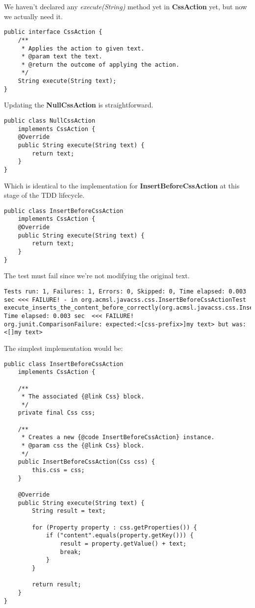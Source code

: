 \documentclass[11pt]{article}
\begin{document}
We haven't declared any \emph{execute(String)} method yet in \textbf{CssAction} yet, but now we actually need it.

\begin{verbatim}
public interface CssAction {
    /**
     * Applies the action to given text.
     * @param text the text.
     * @return the outcome of applying the action.
     */
    String execute(String text);
}
\end{verbatim}

Updating the \textbf{NullCssAction} is straightforward.

\begin{verbatim}
public class NullCssAction
    implements CssAction {
    @Override
    public String execute(String text) {
        return text;
    }
}
\end{verbatim}

Which is identical to the implementation for \textbf{InsertBeforeCssAction} at this stage of the TDD lifecycle.

\begin{verbatim}
public class InsertBeforeCssAction
    implements CssAction {
    @Override
    public String execute(String text) {
        return text;
    }
}
\end{verbatim}

The test must fail since we're not modifying the original text.

\begin{verbatim}
Tests run: 1, Failures: 1, Errors: 0, Skipped: 0, Time elapsed: 0.003 sec <<< FAILURE! - in org.acmsl.javacss.css.InsertBeforeCssActionTest
execute_inserts_the_content_before_correctly(org.acmsl.javacss.css.InsertBeforeCssActionTest)  Time elapsed: 0.003 sec  <<< FAILURE!
org.junit.ComparisonFailure: expected:<[css-prefix>]my text> but was:<[]my text>
\end{verbatim}

The simplest implementation would be:

\begin{verbatim}
public class InsertBeforeCssAction
    implements CssAction {

    /**
     * The associated {@link Css} block.
     */
    private final Css css;

    /**
     * Creates a new {@code InsertBeforeCssAction} instance.
     * @param css the {@link Css} block.
     */
    public InsertBeforeCssAction(Css css) {
        this.css = css;
    }

    @Override
    public String execute(String text) {
        String result = text;

        for (Property property : css.getProperties()) {
            if ("content".equals(property.getKey())) {
                result = property.getValue() + text;
                break;
            }
        }

        return result;
    }
}
\end{verbatim}
\end{document}
